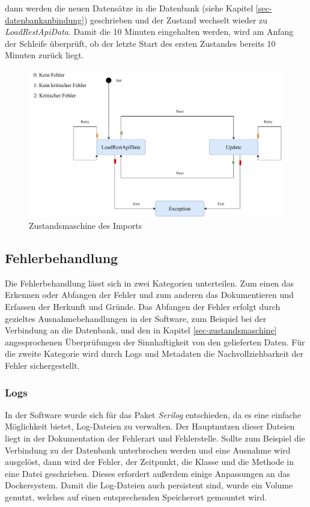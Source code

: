 dann werden die neuen Datensätze in die Datenbank (siehe Kapitel \ref{sec-datenbankanbindung}) geschrieben und der Zustand wechselt wieder zu \textit{LoadRestApiData}. Damit die 10 Minuten
eingehalten werden, wird am Anfang der Schleife überprüft, ob der letzte Start des ersten Zustandes bereits 10 Minuten zurück liegt.
\begin{figure}[H]
    \centering
    \includegraphics[width=\linewidth]{figures/statemachine.pdf}
    \caption{Zustandsmaschine des Imports}
    \label{fig:statemachine}
\end{figure}
\subsection{Fehlerbehandlung}
Die Fehlerbehandlung lässt sich in zwei Kategorien unterteilen. Zum einen das Erkennen oder Abfangen der Fehler und zum anderen das Dokumentieren und Erfassen der Herkunft und Gründe.
Das Abfangen der Fehler erfolgt durch gezieltes Ausnahmebehandlungen in der Software, zum Beispiel bei der Verbindung an die Datenbank, und den in Kapitel \ref{sec-zustandsmaschine} angesprochenen Überprüfungen der Sinnhaftigkeit
von den gelieferten Daten. Für die zweite Kategorie wird durch Logs und Metadaten die Nachvollziehbarkeit der Fehler sichergestellt.
\subsubsection{Logs}
In der Software wurde sich für das Paket \textit{Serilog} entschieden, da es eine einfache Möglichkeit bietet, Log-Dateien zu verwalten.
Der Hauptnutzen dieser Dateien liegt in der Dokumentation der Fehlerart und Fehlerstelle. Sollte zum Beispiel die Verbindung zu der Datenbank
unterbrochen werden und eine Ausnahme wird ausgelöst, dann wird der Fehler, der Zeitpunkt, die Klasse und die Methode in eine Datei geschrieben.
Dieses erfordert außerdem einige Anpassungen an das Dockersystem. Damit die Log-Dateien auch persistent sind, wurde ein Volume genutzt, welches auf einen
entsprechenden Speicherort gemountet wird.
